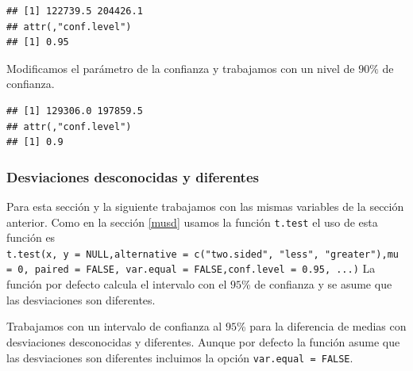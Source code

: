\documentclass[letterpaper,]{book}
\newenvironment{Shaded}{\begin{snugshade}}{\end{snugshade}}
\newcommand{\DataTypeTok}[1]{\textcolor[rgb]{0.13,0.29,0.53}{#1}}
\newcommand{\FloatTok}[1]{\textcolor[rgb]{0.00,0.00,0.81}{#1}}
\newcommand{\KeywordTok}[1]{\textcolor[rgb]{0.13,0.29,0.53}{\textbf{#1}}}
\newcommand{\NormalTok}[1]{#1}
\newcommand{\OperatorTok}[1]{\textcolor[rgb]{0.81,0.36,0.00}{\textbf{#1}}}
\newcommand{\OtherTok}[1]{\textcolor[rgb]{0.56,0.35,0.01}{#1}}
\begin{document}
\begin{verbatim}
## [1] 122739.5 204426.1
## attr(,"conf.level")
## [1] 0.95
\end{verbatim}

Modificamos el parámetro de la confianza y trabajamos con un nivel de \(90\%\) de confianza.

\begin{Shaded}
\end{Shaded}

\begin{verbatim}
## [1] 129306.0 197859.5
## attr(,"conf.level")
## [1] 0.9
\end{verbatim}

\hypertarget{icddd}{%
\subsubsection{Desviaciones desconocidas y diferentes}\label{icddd}}

Para esta sección y la siguiente trabajamos con las mismas variables de la sección anterior. Como en la sección \ref{musd} usamos la función \texttt{t.test} el uso de esta función es \texttt{t.test(x,\ y\ =\ NULL,alternative\ =\ c("two.sided",\ "less",\ "greater"),mu\ =\ 0,\ paired\ =\ FALSE,\ var.equal\ =\ FALSE,conf.level\ =\ 0.95,\ ...)} La función por defecto calcula el intervalo con el \(95\)\% de confianza y se asume que las desviaciones son diferentes.

Trabajamos con un intervalo de confianza al \(95\)\% para la diferencia de medias con desviaciones desconocidas y diferentes. Aunque por defecto la función asume que las desviaciones son diferentes incluimos la opción \texttt{var.equal\ =\ FALSE}.

\begin{Shaded}
\end{Shaded}
\end{document}
